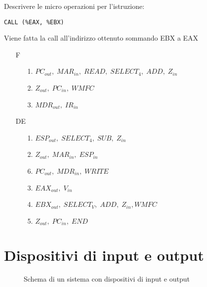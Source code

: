 \documentclass[a4paper]{article}
\theoremstyle{break}
\theoremstyle{break}
\theoremstyle{break}
\theoremstyle{break}
\begin{document}
\begin{exercise}
	Descrivere le micro operazioni per l'istruzione:
	\begin{center}
		\texttt{CALL (\%EAX, \%EBX)}
	\end{center}
	Viene fatta la call all'indirizzo ottenuto sommando EBX a EAX

	\begin{enumerate}
		\item[F]
		      \begin{enumerate}
			      \item[1.] \( PC_{out},\; MAR_{in},\; READ ,\; SELECT_4,\; ADD,\; Z_{in}\)
			      \item[2.] \( Z_{out},\; PC_{in},\;WMFC \)
			      \item[3.] \( MDR_{out},\; IR_{in} \)
		      \end{enumerate}

		\item [DE]
		      \begin{enumerate}
			      \item[1.] \( ESP_{out} ,\; SELECT_4 ,\; SUB,\; Z_{in} \)
			      \item[2.] \( Z_{out},\; MAR_{in} ,\; ESP_{in} \)
			      \item[6.] \( PC_{out} ,\; MDR_{in} ,\; WRITE \)
			      \item[3.] \( EAX_{out} ,\; V_{in} \)
			      \item[4.] \( EBX_{out},\; SELECT_V,\; ADD ,\; Z_{in}, WMFC \)
			      \item[5.] \( Z_{out} ,\; PC_{in} ,\; END\)
		      \end{enumerate}
	\end{enumerate}
\end{exercise}

\section{Dispositivi di input e output}
\begin{figure}[H]
	\centering
	\caption{Schema di un sistema con dispositivi di input e output}
\end{figure}
\end{document}
